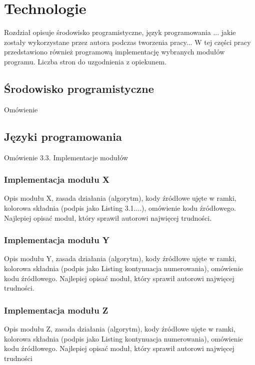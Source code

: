 \section{Technologie}
Rozdział opisuje środowisko programistyczne, język programowania ... jakie zostały
wykorzystane przez autora podczas tworzenia pracy... W tej części pracy przedstawiono
również programową implementację wybranych modułów programu. Liczba stron do
uzgodnienia z opiekunem.
\subsection{Środowisko programistyczne}
Omówienie
\subsection{Języki programowania}
Omówienie
3.3. Implementacje modułów
\subsubsection{Implementacja modułu X}
Opis modułu X, zasada działania (algorytm), kody źródłowe ujęte w ramki, kolorowa składnia
(podpis jako Listing 3.1....), omówienie kodu źródłowego. Najlepiej opisać moduł, który
sprawił autorowi najwięcej trudności.
\subsubsection{Implementacja modułu Y}
Opis modułu Y, zasada działania (algorytm), kody źródłowe ujęte w ramki, kolorowa składnia
(podpis jako Listing kontynuacja numerowania), omówienie kodu źródłowego. Najlepiej
opisać moduł, który sprawił autorowi najwięcej trudności.
\subsubsection{Implementacja modułu Z}
Opis modułu Z, zasada działania (algorytm), kody źródłowe ujęte w ramki, kolorowa składnia
(podpis jako Listing kontynuacja numerowania), omówienie kodu źródłowego. Najlepiej
opisać moduł, który sprawił autorowi najwięcej trudności
